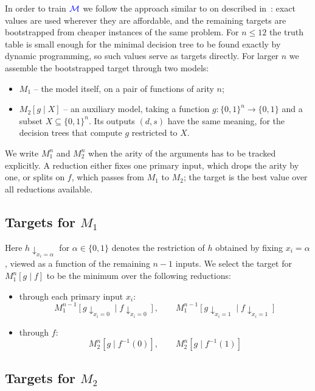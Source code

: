 \documentclass[11pt]{article}
\newcommand{\MLM}{\textcolor{blue}{\mathcal{M}}}
\begin{document}
In order to train $\MLM$ we follow the approach similar to on described
in~\cite{agostinelli2019rubik}: exact values are used wherever they are affordable, and
the remaining targets are bootstrapped from cheaper instances of the same problem. For
$n \leqslant 12$ the truth table is small enough for the minimal decision tree to be
found exactly by dynamic programming, so such values serve as targets directly. For
larger $n$ we assemble the bootstrapped target through two models:
\begin{itemize}
    \item $M_1$ -- the model itself, on a pair of functions of arity $n$;
    \item $M_2\left[g \mid X\right]$ -- an auxiliary model, taking a function
        $g : \{0,1\}^n \to \{0,1\}$ and a subset $X \subseteq \{0,1\}^n$. Its outputs
        $(d, s)$ have the same meaning, for the decision trees that compute $g$
        restricted to $X$.
\end{itemize}

We write $M^n_1$ and $M^n_2$ when the arity of the arguments has to be tracked
explicitly. A reduction either fixes one primary input, which drops the arity by one,
or splits on $f$, which passes from $M_1$ to $M_2$; the target is the best value over
all reductions available.

\subsection{Targets for $M_1$}

Here $h \downarrow_{x_i = \alpha}$ for $\alpha \in \{0, 1\}$ denotes the restriction of
$h$ obtained by fixing $x_i = \alpha$, viewed as a function of the remaining $n - 1$
inputs. We select the target for $M^n_1\left[g \mid f\right]$ to be the minimum over the
following reductions:
\begin{itemize}
    \item through each primary input $x_i$:
        $$
            M^{n-1}_1 \left[g \downarrow_{x_i = 0} \mid f \downarrow_{x_i = 0} \right], \qquad
            M^{n-1}_1 \left[g \downarrow_{x_i = 1} \mid f \downarrow_{x_i = 1} \right]
        $$
    \item through $f$:
        $$
            M^n_2 \left[g \mid f^{-1}(0) \right], \qquad
            M^n_2 \left[g \mid f^{-1}(1) \right]
        $$
\end{itemize}


\subsection{Targets for $M_2$}
\end{document}
